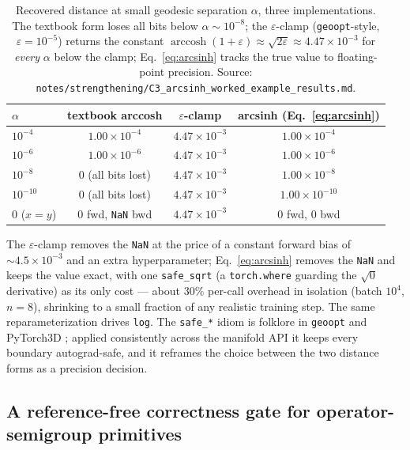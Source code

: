 \documentclass{article}
\newcommand{\code}[1]{\texttt{#1}}
\begin{document}
\begin{table}[t]
  \centering
  \caption{Recovered distance at small geodesic separation $\alpha$,
  three implementations. The textbook form loses all bits below
  $\alpha \sim 10^{-8}$; the $\varepsilon$-clamp
  (\code{geoopt}-style, $\varepsilon = 10^{-5}$) returns the constant
  $\operatorname{arccosh}(1+\varepsilon) \approx \sqrt{2\varepsilon}
  \approx 4.47\times10^{-3}$ for \emph{every} $\alpha$ below the clamp;
  Eq.~\eqref{eq:arcsinh} tracks the true value to floating-point
  precision. Source:
  \code{notes/strengthening/C3\_arcsinh\_worked\_example\_results.md}.}
  \label{tab:arcsinh}
  \begin{tabular}{lccc}
    \toprule
    $\alpha$ & textbook arccosh & $\varepsilon$-clamp & arcsinh (Eq.~\ref{eq:arcsinh}) \\
    \midrule
    $10^{-4}$  & $1.00\times10^{-4}$            & $4.47\times10^{-3}$ & $1.00\times10^{-4}$ \\
    $10^{-6}$  & $1.00\times10^{-6}$            & $4.47\times10^{-3}$ & $1.00\times10^{-6}$ \\
    $10^{-8}$  & $0$ {\footnotesize(all bits lost)} & $4.47\times10^{-3}$ & $1.00\times10^{-8}$ \\
    $10^{-10}$ & $0$ {\footnotesize(all bits lost)} & $4.47\times10^{-3}$ & $1.00\times10^{-10}$ \\
    $0$ ($x=y$) & $0$ fwd, \code{NaN} bwd        & $4.47\times10^{-3}$ & $0$ fwd, $0$ bwd \\
    \bottomrule
  \end{tabular}
\end{table}

The $\varepsilon$-clamp removes the \code{NaN} at the price of a constant
forward bias of $\sim\!4.5\times10^{-3}$ and an extra hyperparameter;
Eq.~\eqref{eq:arcsinh} removes the \code{NaN} and keeps the value exact,
with one \code{safe\_sqrt} (a \code{torch.where} guarding the $\sqrt{0}$
derivative) as its only cost --- about $30\%$ per-call overhead in
isolation (batch $10^4$, $n = 8$), shrinking to a small fraction of any
realistic training step. The same reparameterization drives \code{log}.
The \code{safe\_*} idiom is folklore in \code{geoopt} and PyTorch3D
\citep{kochurov2020geoopt,ravi2020pytorch3d}; applied consistently across
the manifold API it keeps every boundary autograd-safe, and it reframes
the choice between the two distance forms as a precision decision.

\subsection{A reference-free correctness gate for operator-semigroup
primitives}
\label{sec:c7}
\end{document}

